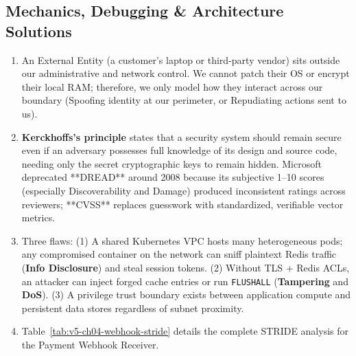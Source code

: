 \subsection*{Mechanics, Debugging \& Architecture Solutions}
\begin{enumerate}[label=\textbf{Solution~\thechapter.\arabic*}, leftmargin=*]
  \item An External Entity (a customer's laptop or third-party vendor) sits outside our administrative and network control. We cannot patch their OS or encrypt their local RAM; therefore, we only model how they interact across our boundary (Spoofing identity at our perimeter, or Repudiating actions sent to us).
  \item \textbf{Kerckhoffs's principle} states that a security system should remain secure even if an adversary possesses full knowledge of its design and source code, needing only the secret cryptographic keys to remain hidden. Microsoft deprecated **DREAD** around 2008 because its subjective 1--10 scores (especially Discoverability and Damage) produced inconsistent ratings across reviewers; **CVSS** replaces guesswork with standardized, verifiable vector metrics.
  \item Three flaws: (1) A shared Kubernetes VPC hosts many heterogeneous pods; any compromised container on the network can sniff plaintext Redis traffic (\textbf{Info Disclosure}) and steal session tokens. (2) Without TLS + Redis ACLs, an attacker can inject forged cache entries or run \texttt{FLUSHALL} (\textbf{Tampering} and \textbf{DoS}). (3) A privilege trust boundary exists between application compute and persistent data stores regardless of subnet proximity.
  \item Table~\ref{tab:v5-ch04-webhook-stride} details the complete STRIDE analysis for the Payment Webhook Receiver.
\end{enumerate}

